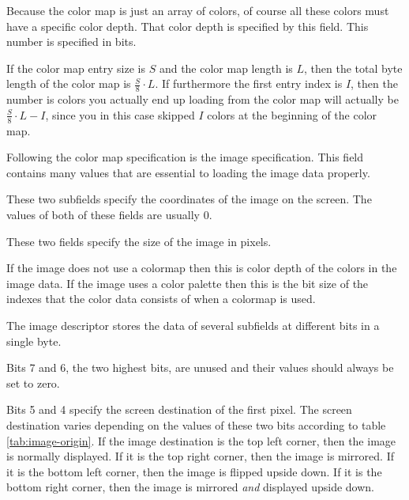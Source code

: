 Because the color map is just an array of colors, of course all
these colors must have a specific color depth. That color depth is
specified by this field. This number is specified in bits.

If the color map entry size is $S$ and the color map length is $L$,
then the total byte length of the color map is $\frac{S}{8} \cdot
L$. If furthermore the first entry index is $I$, then the number is
colors you actually end up loading from the color map will actually be
$\frac{S}{8} \cdot L - I$, since you in this case skipped $I$ colors
at the beginning of the color map.


Following the color map specification is the image specification. This
field contains many values that are essential to loading the image data
properly.



These two subfields specify the coordinates of the image on the
screen. The values of both of these fields are usually $0$.



These two fields specify the size of the image in pixels.


If the image does not use a colormap then this is color depth of the
colors in the image data. If the image uses a color palette then this
is the bit size of the indexes that the color data consists of when a
colormap is used.


The image descriptor stores the data of several subfields at different
bits in a single byte.

Bits 7 and 6, the two highest bits, are unused and their values should
always be set to zero.

Bits 5 and 4 specify the screen destination of the first pixel. The
screen destination varies depending on the values of these two bits
according to table \ref{tab:image-origin}. If the image destination is
the top left corner, then the image is normally displayed. If it is
the top right corner, then the image is mirrored. If it is the bottom
left corner, then the image is flipped upside down. If it is the
bottom right corner, then the image is mirrored \textit{and} displayed
upside down.

